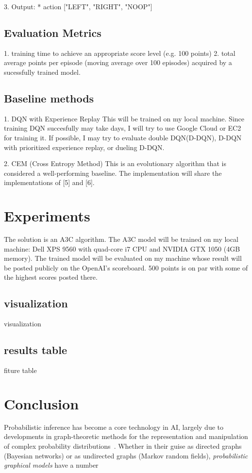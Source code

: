 \documentclass[twoside,11pt]{article}
\begin{document}
3. Output:
	* action ["LEFT", "RIGHT", "NOOP"]

\subsection{Evaluation Metrics}
1. training time to achieve an appropriate score level (e.g. 100 points)
2. total average points per episode (moving average over 100 episodes) acquired by a sucessfully trained model.

\subsection{Baseline methods}
1. DQN with Experience Replay
This will be trained on my local machine. Since training DQN succesfully may take days, I will try to use Google Cloud or EC2 for training it. If possible, I may try to evaluate double DQN(D-DQN), D-DQN with prioritized experience replay, or dueling D-DQN.

2. CEM (Cross Entropy Method)
This is an evolutionary algorithm that is considered a well-performing baseline. The implementation will share the implementations of [5] and [6].

\section{Experiments}

The solution is an A3C algorithm. The A3C model will be trained on my local machine: Dell XPS 9560 with quad-core i7 CPU and NVIDIA GTX 1050 (4GB memory). The trained model will be evaluated on my machine whose result will be posted publicly on the OpenAI's scoreboard. 500 points is on par with some of the highest scores posted there.


\subsection{visualization}
visualization

\subsection{results table}
fiture table

\section{Conclusion}

Probabilistic inference has become a core technology in AI,
largely due to developments in graph-theoretic methods for the 
representation and manipulation of complex probability 
distributions~\citep{pearl:88}.  Whether in their guise as 
directed graphs (Bayesian networks) or as undirected graphs (Markov 
random fields), \emph{probabilistic graphical models} have a number 
\end{document}

